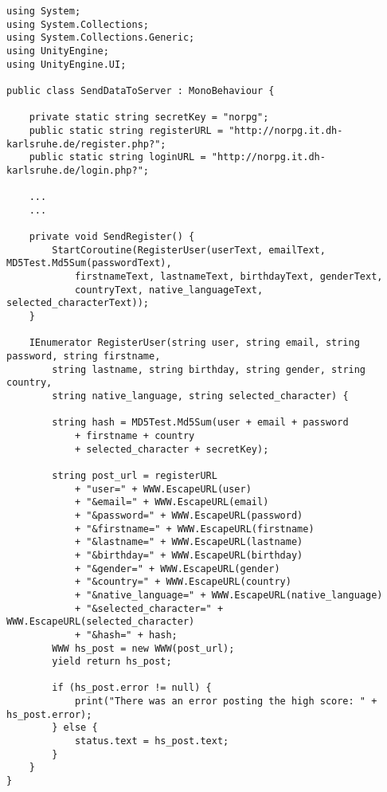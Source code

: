 \begin{scriptsize}
\lstset{
	float,
	caption=Skript SendDataToServer.cs, 
	language=[Sharp]C, 
	frame=single,  
	showstringspaces=false, 
	showspaces=false, 
	numbers=left, 
	captionpos=b, 
	belowcaptionskip=4pt,
	basicstyle=\ttfamily
} 
\begin{lstlisting}[label=lst:c_SendDataToServer]
using System;
using System.Collections;
using System.Collections.Generic;
using UnityEngine;
using UnityEngine.UI;

public class SendDataToServer : MonoBehaviour {

    private static string secretKey = "norpg";
    public static string registerURL = "http://norpg.it.dh-karlsruhe.de/register.php?";
    public static string loginURL = "http://norpg.it.dh-karlsruhe.de/login.php?";

	...
	...

    private void SendRegister() {
        StartCoroutine(RegisterUser(userText, emailText, MD5Test.Md5Sum(passwordText), 
        	firstnameText, lastnameText, birthdayText, genderText, 
        	countryText, native_languageText, selected_characterText));
    }

    IEnumerator RegisterUser(string user, string email, string password, string firstname, 
    	string lastname, string birthday, string gender, string country, 
    	string native_language, string selected_character) {

        string hash = MD5Test.Md5Sum(user + email + password 
        	+ firstname + country 
        	+ selected_character + secretKey);

        string post_url = registerURL
            + "user=" + WWW.EscapeURL(user)
            + "&email=" + WWW.EscapeURL(email)
            + "&password=" + WWW.EscapeURL(password)
            + "&firstname=" + WWW.EscapeURL(firstname)
            + "&lastname=" + WWW.EscapeURL(lastname)
            + "&birthday=" + WWW.EscapeURL(birthday)
            + "&gender=" + WWW.EscapeURL(gender)
            + "&country=" + WWW.EscapeURL(country)
            + "&native_language=" + WWW.EscapeURL(native_language)
            + "&selected_character=" + WWW.EscapeURL(selected_character)
            + "&hash=" + hash;
        WWW hs_post = new WWW(post_url);
        yield return hs_post;

        if (hs_post.error != null) {
            print("There was an error posting the high score: " + hs_post.error);
        } else {
            status.text = hs_post.text;
        }
    }
}

\end{lstlisting}
\end{scriptsize}

